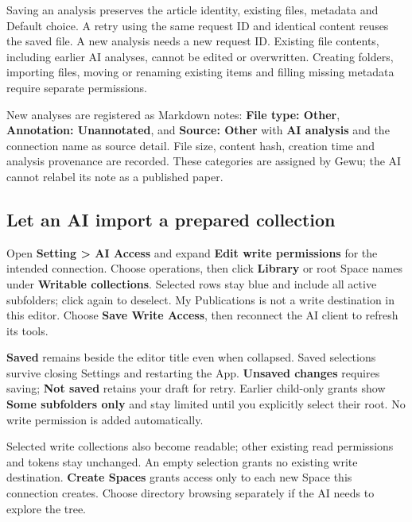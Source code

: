 \documentclass[10pt,letterpaper,oneside]{scrreprt}
\begin{document}
Saving an analysis preserves the article identity, existing files, metadata and Default choice. A retry using the same request ID and identical content reuses the saved file. A new analysis needs a new request ID. Existing file contents, including earlier AI analyses, cannot be edited or overwritten. Creating folders, importing files, moving or renaming existing items and filling missing metadata require separate permissions.

New analyses are registered as Markdown notes: \textbf{File type: Other}, \textbf{Annotation: Unannotated}, and \textbf{Source: Other} with \textbf{AI analysis} and the connection name as source detail. File size, content hash, creation time and analysis provenance are recorded. These categories are assigned by Gewu; the AI cannot relabel its note as a published paper.

\subsection{Let an AI import a prepared collection}\label{let-an-ai-import-a-prepared-collection}

Open \textbf{Setting \textgreater{} AI Access} and expand \textbf{Edit write permissions} for the intended connection. Choose operations, then click \textbf{Library} or root Space names under \textbf{Writable collections}. Selected rows stay blue and include all active subfolders; click again to deselect. My Publications is not a write destination in this editor. Choose \textbf{Save Write Access}, then reconnect the AI client to refresh its tools.

\textbf{Saved} remains beside the editor title even when collapsed. Saved selections survive closing Settings and restarting the App. \textbf{Unsaved changes} requires saving; \textbf{Not saved} retains your draft for retry. Earlier child-only grants show \textbf{Some subfolders only} and stay limited until you explicitly select their root. No write permission is added automatically.

Selected write collections also become readable; other existing read permissions and tokens stay unchanged. An empty selection grants no existing write destination. \textbf{Create Spaces} grants access only to each new Space this connection creates. Choose directory browsing separately if the AI needs to explore the tree.
\end{document}
